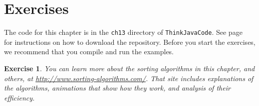 \documentclass[12pt]{book}
\theoremstyle{exercise}
\newtheorem{exercise}{Exercise}[chapter]
\begin{document}
\section{Exercises}

The code for this chapter is in the {\tt ch13} directory of {\tt ThinkJavaCode}.
See page~\pageref{code} for instructions on how to download the repository.
Before you start the exercises, we recommend that you compile and run the examples.


\begin{exercise}
You can learn more about the sorting algorithms in this chapter, and others, at \url{http://www.sorting-algorithms.com/}.
That site includes explanations of the algorithms, animations that show how they work, and analysis of their efficiency.
\end{exercise}
\end{document}

